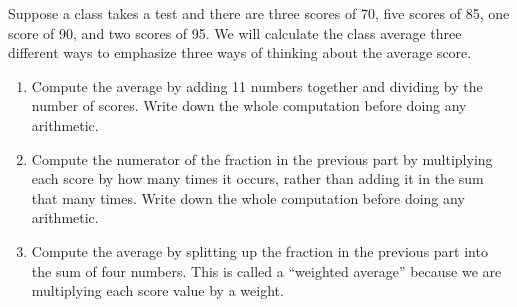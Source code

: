 \begin{problem}\label{average value methods}
  Suppose a class takes a test and there are three scores of 70, five scores of 85, one score of 90, and two scores of 95.  We will calculate the class average three different ways to emphasize three ways of thinking about the average score.
  \begin{enumerate}
  \item Compute the average by adding 11 numbers together and dividing by the number of scores.   Write down the whole computation before doing any arithmetic.
  \item Compute the numerator of the fraction in the previous part by multiplying each score by how many times it occurs, rather than adding it in the sum that many times.  Write down the whole computation before doing any arithmetic.
  \item Compute the average by splitting up the fraction in the previous part into the sum of four numbers.  This is called a ``weighted average'' because we are multiplying each score value by a weight.
  \end{enumerate}
\end{problem}

